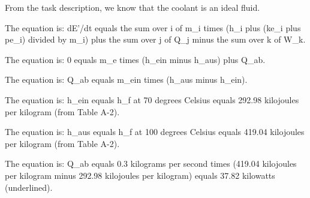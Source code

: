 From the task description, we know that the coolant is an ideal fluid.

The equation is:
dE'/dt equals the sum over i of m_i times (h_i plus (ke_i plus pe_i) divided by m_i) plus the sum over j of Q_j minus the sum over k of W_k.

The equation is:
0 equals m_e times (h_ein minus h_aus) plus Q_ab.

The equation is:
Q_ab equals m_ein times (h_aus minus h_ein).

The equation is:
h_ein equals h_f at 70 degrees Celsius equals 292.98 kilojoules per kilogram (from Table A-2).

The equation is:
h_aus equals h_f at 100 degrees Celsius equals 419.04 kilojoules per kilogram (from Table A-2).

The equation is:
Q_ab equals 0.3 kilograms per second times (419.04 kilojoules per kilogram minus 292.98 kilojoules per kilogram) equals 37.82 kilowatts (underlined).